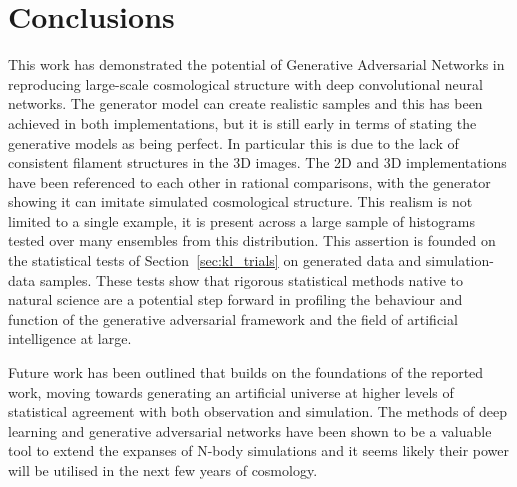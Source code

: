 \documentclass[twocolumn]{article}
\numberwithin{equation}{section}
\begin{document}

\section{Conclusions}\label{sec:conclusions}
This work has demonstrated the potential of Generative Adversarial Networks in reproducing large-scale cosmological 
structure with deep convolutional neural networks. The generator model can create realistic samples and this has been 
achieved in both implementations, but it is still early in terms of stating the generative models as being perfect. In 
particular this is due to the lack of consistent filament structures in the 3D images. The 2D and 3D implementations have 
been referenced to each other in rational comparisons, with the generator showing it can imitate simulated cosmological 
structure. %
This realism is not limited to a single example, it is present across a large sample of histograms tested over many 
ensembles from this distribution. This assertion is founded on the statistical tests of Section~\ref{sec:kl_trials} on 
generated data and simulation-data samples. These tests show that rigorous statistical methods native to natural science 
are a potential step forward in profiling the behaviour and function of the generative adversarial framework and the field
of artificial intelligence at large. 

Future work has been outlined that builds on the foundations of the reported work, moving towards generating an artificial 
universe at higher levels of statistical agreement with both observation and simulation. The methods of deep learning and
generative adversarial networks have been shown to be a valuable tool to extend the expanses of N-body simulations and it 
seems likely their power will be utilised in the next few years of cosmology. 

{\footnotesize  %
}

\end{document}
